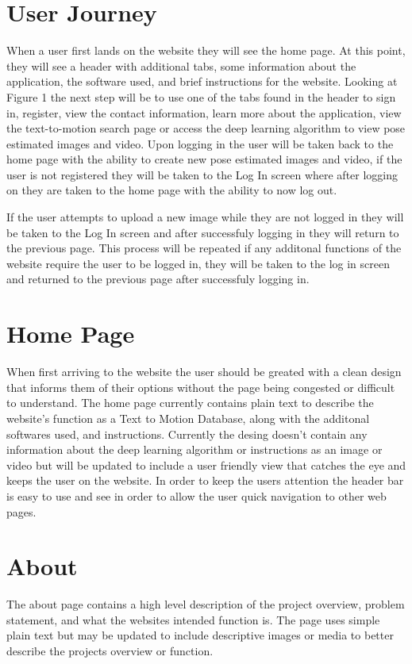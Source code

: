 \documentclass{scrreprt}
\begin{document}
\section{User Journey}
When a user first lands on the website they will see the home page. At this point, they will see a header with additional tabs, some information about the application, the software used, and brief instructions for the website. Looking at Figure 1 the next step will be to use one of the tabs found in the header to sign in, register, view the contact information, learn more about the application, view the text-to-motion search page or access the deep learning algorithm to view pose estimated images and video. Upon logging in the user will be taken back to the home page with the ability to create new pose estimated images and video, if the user is not registered they will be taken to the Log In screen where after logging on they are taken to the home page with the ability to now log out.

If the user attempts to upload a new image while they are not logged in they will be taken to the Log In screen and after successfuly logging in they will return to the previous page. This process will be repeated if any additonal functions of the website require the user to be logged in, they will be taken to the log in screen and returned to the previous page after successfuly logging in.

\section{Home Page}
When first arriving to the website the user should be greated with a clean design that informs them of their options without the page being congested or difficult to understand. The home page currently contains plain text to describe the website's function as a Text to Motion Database, along with the additonal softwares used, and instructions. Currently the desing doesn't contain any information about the deep learning algorithm or instructions as an image or video but will be updated to include a user friendly view that catches the eye and keeps the user on the website. In order to keep the users attention the header bar is easy to use and see in order to allow the user quick navigation to other web pages.

\section{About}
The about page contains a high level description of the project overview, problem statement, and what the websites intended function is. The page uses simple plain text but may be updated to include descriptive images or media to better describe the projects overview or function.
\end{document}
